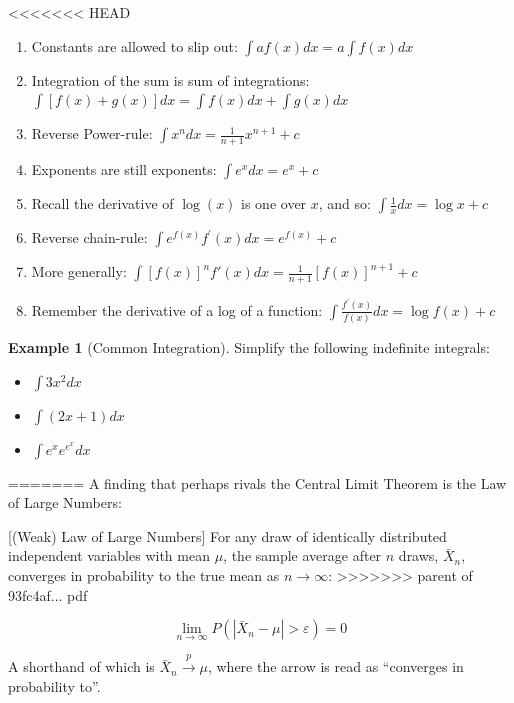 \documentclass[]{book}
\providecommand{\tightlist}{%
  \setlength{\itemsep}{0pt}\setlength{\parskip}{0pt}}
\theoremstyle{definition}
\theoremstyle{definition}
\newtheorem{example}{Example}[chapter]
\theoremstyle{definition}
\theoremstyle{remark}
\begin{document}
<<<<<<< HEAD
\begin{enumerate}
\def\labelenumi{\arabic{enumi}.}
\tightlist
\item
  Constants are allowed to slip out: \(\int a f(x)dx = a\int f(x)dx\)
\item
  Integration of the sum is sum of integrations: \(\int [f(x)+g(x)]dx=\int f(x)dx + \int g(x)dx\)
\item
  Reverse Power-rule: \(\int x^n dx = \frac{1}{n+1} x^{n+1} + c\)
\item
  Exponents are still exponents: \(\int e^x dx = e^x +c\)
\item
  Recall the derivative of \(\log(x)\) is one over \(x\), and so: \(\int \frac{1}{x} dx = \log x + c\)
\item
  Reverse chain-rule: \(\int e^{f(x)}f^\prime(x)dx = e^{f(x)}+c\)
\item
  More generally: \(\int [f(x)]^n f'(x)dx = \frac{1}{n+1}[f(x)]^{n+1}+c\)
\item
  Remember the derivative of a log of a function: \(\int \frac{f^\prime(x)}{f(x)}dx=\log f(x) + c\)
\end{enumerate}

\begin{example}[Common Integration]
\protect\hypertarget{exm:unnamed-chunk-25}{}{\label{exm:unnamed-chunk-25} {} }Simplify the following indefinite integrals:

\begin{itemize}
\tightlist
\item
  \(\int 3x^2 dx\)
\item
  \(\int (2x+1)dx\)
\item
  \(\int e^x e^{e^x} dx\)
\end{itemize}
\end{example}
=======
A finding that perhaps rivals the Central Limit Theorem is the Law of Large Numbers:

[(Weak) Law of Large Numbers]
\protect\hypertarget{thm:lln-lim}{}{\label{thm:lln-lim} {} }For any draw of identically distributed independent variables with mean \(\mu\), the sample average after \(n\) draws, \(\bar{X}_n\), converges in probability to the true mean as \(n \rightarrow \infty\):
>>>>>>> parent of 93fc4af... pdf

\[\lim\limits_{n\to \infty} P(|\bar{X}_n - \mu | > \varepsilon) = 0\]

A shorthand of which is \(\bar{X}_n \xrightarrow{p} \mu\), where the arrow is read as ``converges in probability to''.
\end{document}
